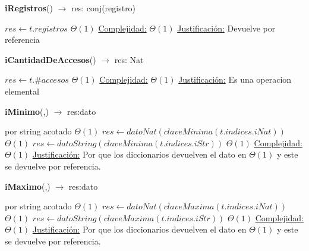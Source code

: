 \begin{algorithm}[H]{\textbf{iRegistros}() $\to$ res: conj(registro)}
	\begin{algorithmic}[1]
		\State $res \gets t.registros$	\Comment $\Theta(1)$
		\medskip
		\Statex \underline{Complejidad:} $\Theta(1)$
		\Statex \underline{Justificación:} Devuelve por referencia
	\end{algorithmic}
\end{algorithm}


\begin{algorithm}[H]{\textbf{iCantidadDeAccesos}() $\to$ res: Nat}
	\begin{algorithmic}[1]
		\State $res \gets t.\#accesos$	\Comment $\Theta(1)$
		\medskip
		\Statex \underline{Complejidad:} $\Theta(1)$
		\Statex \underline{Justificación:} Es una operacion elemental
	\end{algorithmic}
\end{algorithm}

\begin{algorithm}[H]{\textbf{iMinimo}(,) $\to$ res:dato}
	\begin{algorithmic}[1]
		 \Comment  por string acotado $\Theta(1)$
			\State $res \gets datoNat(claveMinima(t.indices.iNat))$ \Comment $\Theta(1)$
		\Else
			\State $res \gets datoString(claveMinima(t.indices.iStr))$ \Comment $\Theta(1)$
		\EndIf
		\medskip
		\Statex \underline{Complejidad:} $\Theta(1)$
		\Statex \underline{Justificación:} Por que los diccionarios devuelven el dato en $\Theta(1)$ y este se devuelve por referencia.
	\end{algorithmic}
\end{algorithm}

\begin{algorithm}[H]{\textbf{iMaximo}(,) $\to$ res:dato}
	\begin{algorithmic}[1]
		 \Comment por string acotado $\Theta(1)$
			\State $res \gets datoNat(claveMaxima(t.indices.iNat))$ \Comment $\Theta(1)$
		\Else
			\State $res \gets datoString(claveMaxima(t.indices.iStr))$ \Comment $\Theta(1)$
		\EndIf
		\medskip
		\Statex \underline{Complejidad:} $\Theta(1)$
		\Statex \underline{Justificación:}  Por que los diccionarios devuelven el dato en $\Theta(1)$ y este se devuelve por referencia.
	\end{algorithmic}
\end{algorithm}

